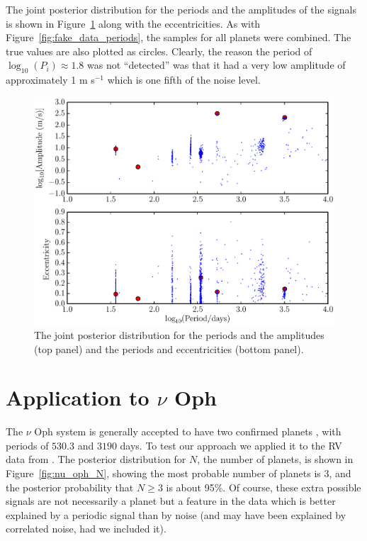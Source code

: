 \documentclass[useAMS,usenatbib]{mn2e}
\begin{document}
The joint posterior distribution for the periods and the amplitudes of the
signals is shown in Figure~\ref{fig:fake_data_posterior} along with the
eccentricities. As with Figure~\ref{fig:fake_data_periods}, the samples for
all planets were combined. The true values are also plotted as circles. Clearly, the
reason the period of $\log_{10}(P_i) \approx 1.8$ was not ``detected'' was that
it had a very low amplitude of approximately 1 m s$^{-1}$ which is one fifth
of the noise level.

\begin{figure}
\includegraphics[scale=0.4]{Figures/fake_data_posterior.eps}
\caption{The joint posterior distribution for the periods and the amplitudes
(top panel) and the periods and eccentricities (bottom panel).
\label{fig:fake_data_posterior}}
\end{figure}


\section{Application to $\nu$ Oph}\label{sec:nu_oph}
The $\nu$ Oph system is generally accepted to have two confirmed planets
\citep[e.g.][]{2011AIPC.1331..102Q, 2012PASJ...64..135S, fengji}, with periods
of $530.3$ and $3190$ days. To test our approach we applied it to the RV
data from \citet{2012PASJ...64..135S}.
The posterior distribution for $N$, the number of planets, is shown in
Figure~\ref{fig:nu_oph_N}, showing the most probable number of planets is 3,
and the posterior probability that $N \geq 3$ is about 95\%. Of course, these
extra possible signals are not necessarily a planet but a feature in the data
which is better explained by a periodic signal than by noise (and may have been
explained by correlated noise, had we included it).
\end{document}
